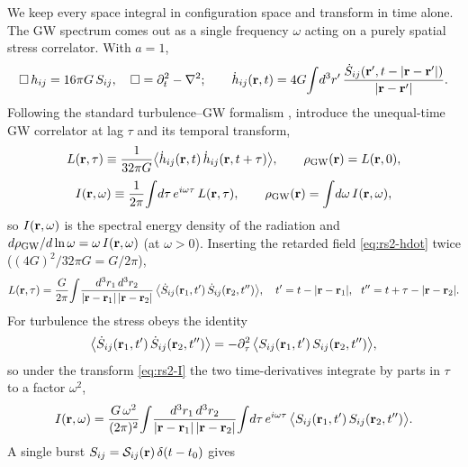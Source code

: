 \documentclass[10pt,prd,aps,nobibnotes,superscriptaddress,preprintnumbers,notitlepage]{revtex4-1}
\newcommand{\br}{{\bf r}}
\begin{document}
We keep every space integral in configuration space and transform in time alone. The
GW spectrum comes out as a single frequency $\omega$ acting on a purely spatial stress
correlator. With $a=1$,
\begin{equation}
  \Box\,h_{ij}=16\pi G\,S_{ij},\quad \Box=\partial_t^2-\nabla^2;
  \qquad
  \dot h_{ij}(\br,t)=4G\!\int\! d^3r'\,\frac{\dot S_{ij}(\br',t-|\br-\br'|)}{|\br-\br'|}.
  \label{eq:rs2-hdot}
\end{equation}
Following the standard turbulence--GW formalism \cite{Kosowsky:2001xp,Gogoberidze:2007an},
introduce the unequal-time GW correlator at lag $\tau$ and its temporal transform,
\begin{equation}
  L(\br,\tau)\equiv\frac{1}{32\pi G}\bigl\langle\dot h_{ij}(\br,t)\,\dot h_{ij}(\br,t+\tau)\bigr\rangle,
  \qquad \rho_{\rm GW}(\br)=L(\br,0),
  \label{eq:rs2-L}
\end{equation}
\begin{equation}
  I(\br,\omega)\equiv\frac{1}{2\pi}\!\int\! d\tau\,e^{i\omega\tau}\,L(\br,\tau),
  \qquad \rho_{\rm GW}(\br)=\int\! d\omega\,I(\br,\omega),
  \label{eq:rs2-I}
\end{equation}
so $I(\br,\omega)$ is the spectral energy density of the radiation and
$d\rho_{\rm GW}/d\ln\omega=\omega\,I(\br,\omega)$ (at $\omega>0$). Inserting the
retarded field \eqref{eq:rs2-hdot} twice ($(4G)^2/32\pi G=G/2\pi$),
\begin{equation}
  L(\br,\tau)=\frac{G}{2\pi}\!\int\!
  \frac{d^3r_1\,d^3r_2}{|\br-\br_1|\,|\br-\br_2|}\,
  \bigl\langle\dot S_{ij}(\br_1,t')\,\dot S_{ij}(\br_2,t'')\bigr\rangle,
  \quad t'=t-|\br-\br_1|,\ \ t''=t+\tau-|\br-\br_2|.
  \label{eq:rs2-Lret}
\end{equation}
For turbulence the stress obeys the identity \cite{Gogoberidze:2007an}
\begin{equation}
  \bigl\langle\dot S_{ij}(\br_1,t')\,\dot S_{ij}(\br_2,t'')\bigr\rangle
  =-\partial_\tau^2\,\bigl\langle S_{ij}(\br_1,t')\,S_{ij}(\br_2,t'')\bigr\rangle,
  \label{eq:rs2-id}
\end{equation}
so under the transform \eqref{eq:rs2-I} the two time-derivatives integrate by parts in
$\tau$ to a factor $\omega^2$,
\begin{equation}
  I(\br,\omega)=\frac{G\,\omega^2}{(2\pi)^2}\!\int\!
  \frac{d^3r_1\,d^3r_2}{|\br-\br_1|\,|\br-\br_2|}\!\int\! d\tau\,e^{i\omega\tau}\,
  \bigl\langle S_{ij}(\br_1,t')\,S_{ij}(\br_2,t'')\bigr\rangle.
  \label{eq:rs2-Iw}
\end{equation}
A single burst $S_{ij}=\mathcal{S}_{ij}(\br)\,\delta(t-t_0)$ gives
\end{document}

